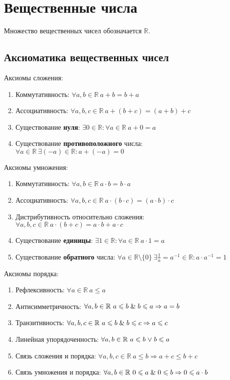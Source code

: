 \section{Вещественные числа}
  Множество вещественных чисел обозначается $\mathbb R$.

\subsection{Аксиоматика вещественных чисел}
Аксиомы сложения:
\begin{enumerate}
	\item Коммутативность: $\forall a, b \in \mathbb R \ a + b = b + a$
	\item Ассоциативность: $\forall a, b, c \in \mathbb R \ a + (b + c) = (a + b) + c$
	\item Существование \textbf{нуля}: $\exists 0 \in \mathbb R \colon \forall a \in \mathbb R \ a + 0 = a$
	\item Существование \textbf{противоположного} числа: $\forall a \in \mathbb R \ \exists (-a) \in \mathbb R \colon a + (-a) = 0$
\end{enumerate}

Аксиомы умножения:
\begin{enumerate}
	\item Коммутативность: $\forall a, b \in \mathbb R \ a \cdot b = b \cdot a$
	\item Ассоциативность: $\forall a, b, c \in \mathbb R \ a \cdot (b \cdot c) = (a \cdot b) \cdot c$
	\item Дистрибутивность относительно сложения: $\forall a, b, c \in \mathbb R \ a \cdot (b + c) = a \cdot b + a \cdot c$
	\item Существование \textbf{единицы}: $\exists 1 \in \mathbb R \colon \forall a \in \mathbb R \ a \cdot 1 = a$
	\item Существование \textbf{обратного} числа: $\forall a \in \mathbb R \setminus \{ 0 \} \ \exists \frac1a = a^{-1} \in \mathbb R \colon a \cdot a^{-1} = 1$
\end{enumerate}

Аксиомы порядка:
\begin{enumerate}
	\item Рефлексивность: $\forall a \in \mathbb R \ a \leqslant a$
	\item Антисимметричность: $\forall a, b \in \mathbb R \ a \leqslant b \mathrel{\&} b \leqslant a \Rightarrow a = b$
	\item Транзитивность: $\forall a, b, c \in \mathbb R \ a \leqslant b \mathrel{\&} b \leqslant c \Rightarrow a \leqslant c$
	\item Линейная упорядоченность: $\forall a, b \in \mathbb R \ a \leqslant b \mathrel{\lor} b \leqslant a$
	\item Связь сложения и порядка: $\forall a, b, c \in \mathbb R \ a \leqslant b \Rightarrow a + c \leqslant b + c$
	\item Связь умножения и порядка: $\forall a, b \in \mathbb R \ 0 \leqslant a \mathrel{\&} 0 \leqslant b \Rightarrow 0 \leqslant a \cdot b$
\end{enumerate}

